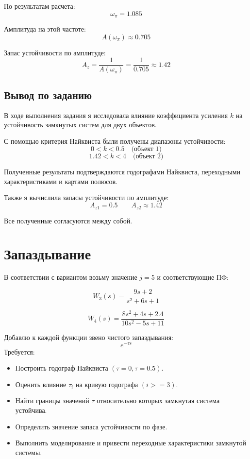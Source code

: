 \documentclass[a4paper,12pt]{article}
\begin{document}
	По результатам расчета:
	\[
	\omega_\pi = 1.085
	\]
	
	Амплитуда на этой частоте:
	\[
	A(\omega_\pi)
	\approx 0.705
	\]
	
	Запас устойчивости по амплитуде:
	\[
	A_z=\frac{1}{A(\omega_\pi)}
	=
	\frac{1}{0.705}
	\approx
	1.42
	\]
	


	\newpage
	\subsection{Вывод по заданию}
	
	В ходе выполнения задания я исследовала влияние коэффициента усиления $k$ на устойчивость замкнутых систем для двух объектов.
	
	С помощью критерия Найквиста были получены диапазоны устойчивости:
	\[
	0 < k < 0.5 \quad \text{(объект 1)}
	\]
	\[
	1.42 < k < 4 \quad \text{(объект 2)}
	\]
	
	Полученные результаты подтверждаются годографами Найквиста, переходными характеристиками и картами полюсов.
	
	
	Также я вычислила запасы устойчивости по амплитуде:
	\[
	A_{z1} = 0.5 \qquad
	A_{z2} \approx 1.42
	\]
	
	Все полученные согласуются между собой.
	
	
	
	\newpage
	\section{Запаздывание}
	
	
	В соответствии с вариантом возьму значение \(j = 5\) и соответствующие ПФ:
	
	\[W_3(s) = \dfrac{9s + 2}{s^2 + 6s + 1}\]
	
	\[W_4(s) = \dfrac{8s^2 + 4s + 2.4}{10s^2 - 5s + 11}\]
	
	Добавлю к каждой функции звено чистого запаздывания: \[e^{-\tau s}\]
	Требуется:
	
	\begin{itemize}
		\item Построить годограф Найквиста \((\tau = 0, \tau = 0.5)\).
		
		\item Оценить влияние \(\tau_i\) на кривую годографа \( (i >= 3)\).
		
		\item Найти границы значений \(\tau\) относительно которых замкнутая система устойчива.
		
		\item Определить значение запаса устойчивости по фазе.
		
		\item Выполнить моделирование и привести переходные характеристики замкнутой системы.
		
	\end{itemize}
	
\end{document}
